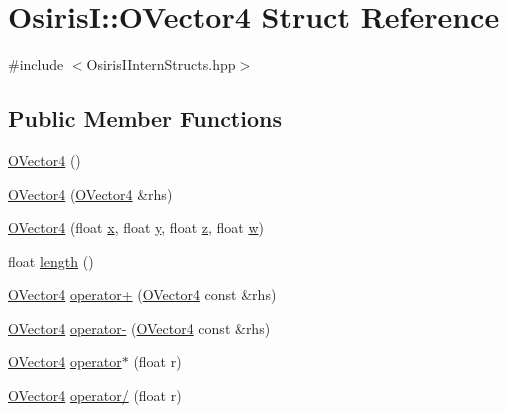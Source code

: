 \hypertarget{struct_osiris_i_1_1_o_vector4}{\section{Osiris\-I\-:\-:O\-Vector4 Struct Reference}
\label{struct_osiris_i_1_1_o_vector4}
}


{\ttfamily \#include $<$Osiris\-I\-Intern\-Structs.\-hpp$>$}

\subsection*{Public Member Functions}
\begin{DoxyCompactItemize}
\item 
\hyperlink{struct_osiris_i_1_1_o_vector4_a2bb2049eca2a52f0864634da6a443350}{O\-Vector4} ()
\item 
\hyperlink{struct_osiris_i_1_1_o_vector4_a071cd586749dc488fa595f967c174b68}{O\-Vector4} (\hyperlink{struct_osiris_i_1_1_o_vector4}{O\-Vector4} \&rhs)
\item 
\hyperlink{struct_osiris_i_1_1_o_vector4_ad493bb740800a302de5729580c8c5ab2}{O\-Vector4} (float \hyperlink{struct_osiris_i_1_1_o_vector4_af1adb199ffe43e6adfe6eca3fb9dd57b}{x}, float \hyperlink{struct_osiris_i_1_1_o_vector4_af5924ef3aa42370253f100d2442e403b}{y}, float \hyperlink{struct_osiris_i_1_1_o_vector4_ab3b7aaea4d1a5023b31aa26baa8288cf}{z}, float \hyperlink{struct_osiris_i_1_1_o_vector4_ae27a30926759cd8487c97977f8df711b}{w})
\item 
float \hyperlink{struct_osiris_i_1_1_o_vector4_ae66769472061e259cee5050a169fa063}{length} ()
\item 
\hyperlink{struct_osiris_i_1_1_o_vector4}{O\-Vector4} \hyperlink{struct_osiris_i_1_1_o_vector4_a4d5fc2ec9fef3222a8324f0962a84c67}{operator+} (\hyperlink{struct_osiris_i_1_1_o_vector4}{O\-Vector4} const \&rhs)
\item 
\hyperlink{struct_osiris_i_1_1_o_vector4}{O\-Vector4} \hyperlink{struct_osiris_i_1_1_o_vector4_ad485bac345d390b220761b95ad35019d}{operator-\/} (\hyperlink{struct_osiris_i_1_1_o_vector4}{O\-Vector4} const \&rhs)
\item 
\hyperlink{struct_osiris_i_1_1_o_vector4}{O\-Vector4} \hyperlink{struct_osiris_i_1_1_o_vector4_adb5927c5fb08267999b2b03a00670477}{operator$\ast$} (float r)
\item 
\hyperlink{struct_osiris_i_1_1_o_vector4}{O\-Vector4} \hyperlink{struct_osiris_i_1_1_o_vector4_a956104445a467ce6e168ebf2fb506cc4}{operator/} (float r)

\end{DoxyCompactItemize}
